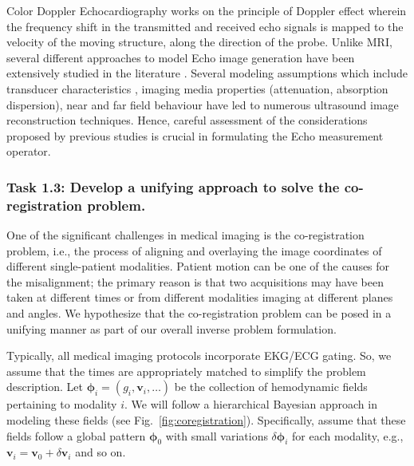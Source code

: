 Color Doppler Echocardiography works on the principle of Doppler effect wherein the frequency shift in the transmitted and received echo signals is mapped to the velocity of the moving structure, along the direction of the probe. Unlike MRI, several different approaches to model Echo image generation have been extensively studied in the literature \cite{verweij2014_EchoSim}. Several modeling assumptions which include transducer characteristics \cite{jensen1992_echosyn}, imaging media properties (attenuation, absorption dispersion)\cite{wells1975_Echoabsoprtion,treeby2011_Echoattenuation}, near and far field behaviour \cite{verweij2014_EchoSim} have led to numerous ultrasound image reconstruction techniques. Hence, careful assessment of the considerations proposed by previous studies is crucial in formulating the Echo measurement operator.

\subsubsection*{Task 1.3: Develop a unifying approach to solve the co-registration problem.}

One of the significant challenges in medical imaging is the co-registration problem, i.e., the process of aligning and overlaying the image coordinates of different single-patient modalities. 
Patient motion can be one of the causes for the misalignment; the primary reason is that two acquisitions may have been taken at different times or from different modalities imaging at different planes and angles.
We hypothesize that the co-registration problem can be posed in a unifying manner as part of our overall inverse problem formulation.

Typically, all medical imaging protocols incorporate EKG/ECG gating.
So, we assume that the times are appropriately matched to simplify the problem description.
Let $\boldsymbol{\phi}_i = (g_i,\mathbf{v}_i,\dots)$ be the collection of hemodynamic fields pertaining to modality $i$.
We will follow a hierarchical Bayesian approach in modeling these fields (see Fig.~\ref{fig:coregistration}).
Specifically, assume that these fields follow a global pattern $\boldsymbol{\phi}_0$ with small variations $\delta\boldsymbol{\phi}_i$ for each modality, e.g.,
$
\mathbf{v}_i = \mathbf{v}_0 + \delta \mathbf{v}_i
$
and so on.

